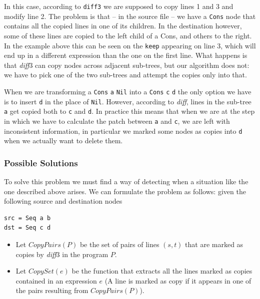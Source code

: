 \documentclass[11pt, titlepage]{article}
\newcommand{\toHaskell}[1]{\texttt{#1}\xspace}
\newcommand{\toClojure}[1]{\texttt{#1}\xspace}
\newcommand{\diff}{\emph{diff}}
\begin{document}
In this case, according to \texttt{diff3} we are supposed to copy lines 1 and 3 
and modify line 2. The problem is that -- in the source file -- we have a \toHaskell{Cons} node 
that contains all the copied lines in one of its children. In the destination 
however, some of these lines are copied to the left child of a Cons, and others 
to the right. In the example above this can be seen on the \toClojure{keep} appearing on line 3, which will end up in a different expression than the one on the first line. 
What happens is that \diff3 can copy nodes across adjacent sub-trees, but our algorithm does not: we have to pick one of the two sub-trees and attempt the copies only into that.

When we are transforming a \toHaskell{Cons} \toHaskell{a} \toHaskell{Nil} into a \toHaskell{Cons} \toHaskell{c} \toHaskell{d} the only option we have is to insert \toHaskell{d} in the place of \toHaskell{Nil}. 
However, according to \diff, lines in the sub-tree \toHaskell{a} get copied both to \toHaskell{c} and \toHaskell{d}. In practice this means that when we are at the step in which we have to calculate the patch between \toHaskell{a} and \toHaskell{c}, we are left with inconsistent information, in particular we marked some nodes as copies into \toHaskell{d} when we actually want to delete them.

\subsubsection*{Possible Solutions}

To solve this problem we must find a way of detecting when a situation like the 
one described above arises. We can formulate the problem as follows:
given the following source and destination nodes

\begin{verbatim}
src = Seq a b
dst = Seq c d
\end{verbatim}


\begin{itemize}
  \item Let $CopyPairs(P)$ be the set of pairs of lines $(s,t)$ that are marked as copies by \diff3 in the program $P$.

\item Let $CopySet(e)$ be the function that extracts all the lines marked as copies 
contained in an expression $e$ (A line is marked as copy if it appears in one of the pairs resulting from $CopyPairs(P)$).
\end{itemize}
\end{document}
